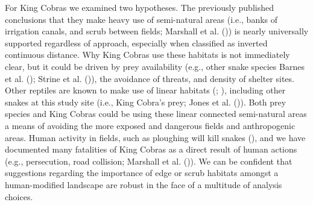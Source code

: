 \documentclass[10pt,a4paper]{article}
\begin{document}
For King Cobras we examined two hypotheses.
The previously published conclusions that they make heavy use of semi-natural areas (i.e., banks of irrigation canals, and scrub between fields; Marshall et al. ()) is nearly universally supported regardless of approach, especially when classified as inverted continuous distance.
Why King Cobras use these habitats is not immediately clear, but it could be driven by prey availability (e.g., other snake species Barnes et al. (); Strine et al. ()), the avoidance of threats, and density of shelter sites.
Other reptiles are known to make use of linear habitats (; ), including other snakes at this study site (i.e., King Cobra's prey; Jones et al. ()).
Both prey species and King Cobras could be using these linear connected semi-natural areas a means of avoiding the more exposed and dangerous fields and anthropogenic areas.
Human activity in fields, such as ploughing will kill snakes (), and we have documented many fatalities of King Cobras as a direct result of human actions (e.g., persecution, road collision; Marshall et al. ()).
We can be confident that suggestions regarding the importance of edge or scrub habitats amongst a human-modified landscape are robust in the face of a multitude of analysis choices.
\end{document}
